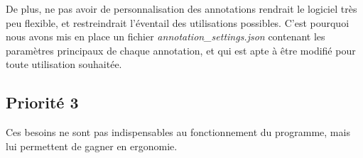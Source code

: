 \begin{description}
    De plus, ne pas avoir de personnalisation des annotations
    rendrait le logiciel très peu flexible, et restreindrait
    l'éventail des utilisations possibles.
    C'est pourquoi nous avons mis en place un fichier
    \textit{annotation\_settings.json} contenant les paramètres
    principaux de chaque annotation, et qui est apte à être
    modifié pour toute utilisation souhaitée.
    
\end{description}

\subsection{Priorité 3}

Ces besoins ne sont pas indispensables au fonctionnement du
programme, mais lui permettent de gagner en ergonomie.
\bigskip

